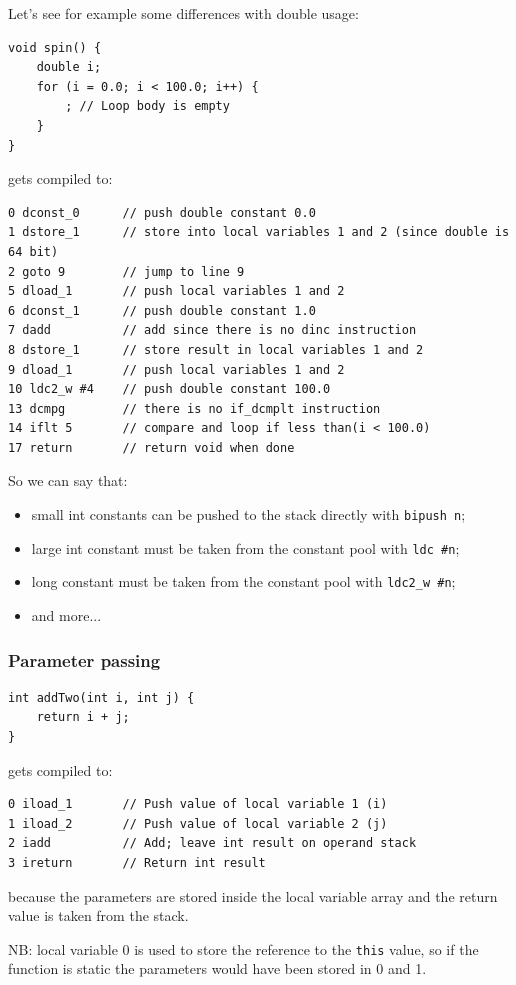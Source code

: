 Let's see for example some differences with double usage:
\begin{verbatim}
void spin() {
    double i;
    for (i = 0.0; i < 100.0; i++) {
        ; // Loop body is empty
    }
} 
\end{verbatim}
gets compiled to:
\begin{verbatim}
0 dconst_0      // push double constant 0.0
1 dstore_1      // store into local variables 1 and 2 (since double is 64 bit)
2 goto 9        // jump to line 9
5 dload_1       // push local variables 1 and 2
6 dconst_1      // push double constant 1.0
7 dadd          // add since there is no dinc instruction
8 dstore_1      // store result in local variables 1 and 2
9 dload_1       // push local variables 1 and 2
10 ldc2_w #4    // push double constant 100.0
13 dcmpg        // there is no if_dcmplt instruction
14 iflt 5       // compare and loop if less than(i < 100.0)
17 return       // return void when done
\end{verbatim}

So we can say that:
\begin{itemize}
    \item small int constants can be pushed to the stack directly with \verb|bipush n|;
    \item large int constant must be taken from the constant pool with \verb|ldc #n|;
    \item long constant must be taken from the constant pool with \verb|ldc2_w #n|;
    \item and more...
\end{itemize}

\subsubsection{Parameter passing}
\begin{verbatim}
int addTwo(int i, int j) {
    return i + j;
}
\end{verbatim}
gets compiled to:
\begin{verbatim}
0 iload_1       // Push value of local variable 1 (i)
1 iload_2       // Push value of local variable 2 (j)
2 iadd          // Add; leave int result on operand stack
3 ireturn       // Return int result
\end{verbatim}
because the parameters are stored inside the local variable array and the return value is taken from the stack.

NB: local variable 0 is used to store the reference to the \verb|this| value, so if the function is static the parameters would have been stored in 0 and 1.

